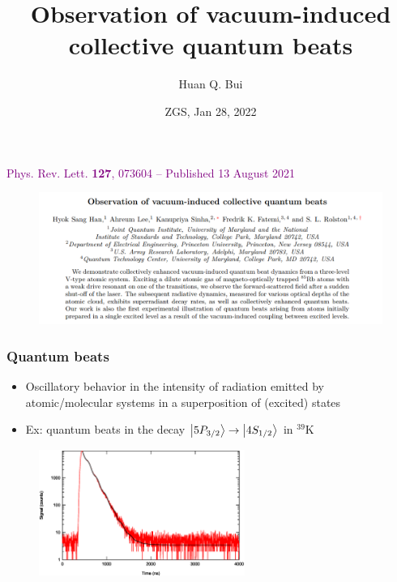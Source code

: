 \documentclass{beamer}
\title[\textcolor{white}{{Observation of vacuum-induced collective quantum beats}}]
{
	Observation of vacuum-induced collective quantum beats
}
\author[Bui] %
{Huan Q. Bui
	}
\institute[MIT] %
{
}
\date{ZGS, Jan 28, 2022}
\theoremstyle{definition}
\begin{document}
 
\frame{\titlepage}




 





\begin{frame}
\textcolor{purple}{{Phys. Rev. Lett. \textbf{127}, 073604 – Published 13 August 2021}}
	\begin{figure}[!htb]
		\includegraphics[width=1\textwidth]{abstract.png}
	\end{figure}
\end{frame}




\begin{frame}
\frametitle{Quantum beats}
\begin{itemize}
	\item Oscillatory behavior in the intensity of radiation emitted by atomic/molecular systems in a superposition of (excited) states
	
	\item Ex: quantum beats in the decay $\ket{5P_{3/2}}\to \ket{4S_{1/2}}$ in $^{39}$K
\end{itemize}




\begin{figure}[!htb]
	\includegraphics[width=0.6\textwidth]{big_beats_2.eps}
\end{figure}



\end{frame}
\end{document}

